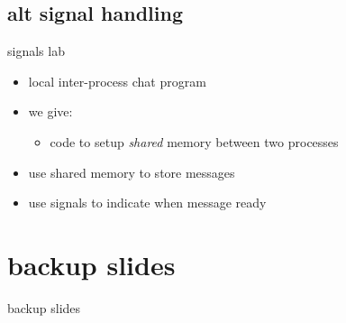 \subsection{alt signal handling}


\begin{frame}{signals lab}
    \begin{itemize}
    \item local inter-process chat program
    \item we give:
        \begin{itemize}
        \item code to setup \textit{shared} memory between two processes
        \end{itemize}
    \item use shared memory to store messages
    \item use signals to indicate when message ready
    \end{itemize}
\end{frame}



\section{backup slides}
\begin{frame}{backup slides}
\end{frame}






